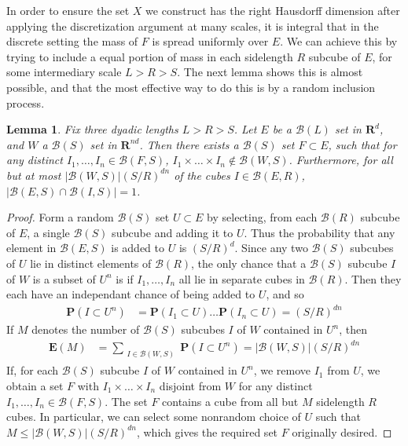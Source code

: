 \documentclass{article}
\theoremstyle{plain}
\newtheorem{lemma}{Lemma}
\theoremstyle{plain}
\begin{document}
In order to ensure the set $X$ we construct has the right Hausdorff dimension after applying the discretization argument at many scales, it is integral that in the discrete setting the mass of $F$ is spread uniformly over $E$. We can achieve this by trying to include a equal portion of mass in each sidelength $R$ subcube of $E$, for some intermediary scale $L > R > S$. The next lemma shows this is almost possible, and that the most effective way to do this is by a random inclusion process.

\begin{lemma}
	Fix three dyadic lengths $L > R > S$. Let $E$ be a $\mathcal{B}(L)$ set in $\mathbf{R}^d$, and $W$ a $\mathcal{B}(S)$ set in $\mathbf{R}^{nd}$. Then there exists a $\mathcal{B}(S)$ set $F \subset E$, such that for any distinct $I_1, \dots, I_n \in \mathcal{B}(F,S)$, $I_1 \times \dots \times I_n \not \in \mathcal{B}(W,S)$. Furthermore, for all but at most $|\mathcal{B}(W,S)|(S/R)^{dn}$ of the cubes $I \in \mathcal{B}(E,R)$, $|\mathcal{B}(E,S) \cap \mathcal{B}(I,S)| = 1$.
\end{lemma}
\begin{proof}
	Form a random $\mathcal{B}(S)$ set $U \subset E$ by selecting, from each $\mathcal{B}(R)$ subcube of $E$, a single $\mathcal{B}(S)$ subcube and adding it to $U$. Thus the probability that any element in $\mathcal{B}(E,S)$ is added to $U$ is $(S/R)^d$. Since any two $\mathcal{B}(S)$ subcubes of $U$ lie in distinct elements of $\mathcal{B}(R)$, the only chance that a $\mathcal{B}(S)$ subcube $I$ of $W$ is a subset of $U^n$ is if $I_1, \dots, I_n$ all lie in separate cubes in $\mathcal{B}(R)$. Then they each have an independant chance of being added to $U$, and so
	\begin{align*}
		\mathbf{P}(I \subset U^n) &= \mathbf{P}(I_1 \subset U) \dots \mathbf{P}(I_n \subset U) = (S/R)^{dn}
	\end{align*}
	If $M$ denotes the number of $\mathcal{B}(S)$ subcubes $I$ of $W$ contained in $U^n$, then
	\begin{align*}
		\mathbf{E}(M) &= \sum_{\substack{I \in \mathcal{B}(W,S)}} \mathbf{P}(I \subset U^n) = |\mathcal{B}(W,S)| (S/R)^{dn}
	\end{align*}
	If, for each $\mathcal{B}(S)$ subcube $I$ of $W$ contained in $U^n$, we remove $I_1$ from $U$, we obtain a set $F$ with $I_1 \times \dots \times I_n$ disjoint from $W$ for any distinct $I_1, \dots, I_n \in \mathcal{B}(F,S)$. The set $F$ contains a cube from all but $M$ sidelength $R$ cubes. In particular, we can select some nonrandom choice of $U$ such that $M \leq |\mathcal{B}(W,S)| (S/R)^{dn}$, which gives the required set $F$ originally desired.
\end{proof}
\end{document}
